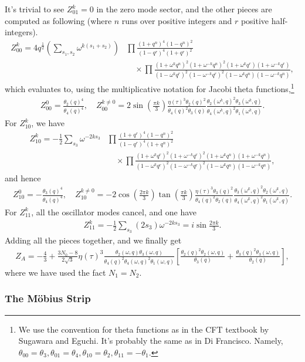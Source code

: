 \documentclass[12pt]{article}
\newcommand{\ie}{\begin{equation}\begin{aligned}}
\newcommand{\fe}{\end{aligned}\end{equation}}
\begin{document}
It's trivial to see $Z_{01}^k=0$ in the zero mode sector, and the other pieces are computed as following (where $n$ runs over positive integers and $r$ positive half-integers).  
\ie
Z_{00}^k = 4q^{\frac{1}{2}}\left(\sum_{s_1,s_2} \omega^{k(s_1+s_2)}\right)&\prod \frac{(1+q^n)^4(1-q^n)^2}{(1-q^r)^4(1+q^r)^2} \\
&\quad \times\prod \frac{(1+\omega^k q^n)^2(1+\omega^{-k} q^n)^2(1+\omega^k q^r)(1+\omega^{-k}q^r)}{(1-\omega^k q^r)^2(1-\omega^{-k} q^r)^2(1-\omega^k q^n)(1-\omega^{-k} q^n)},
\fe
which evaluates to, using the multiplicative notation for Jacobi theta functions,\footnote{We use the convention for theta functions as in the CFT textbook by Sugawara and Eguchi. It's probably the same as in Di Francisco. Namely, $\theta_{00}=\theta_3, \theta_{01}=\theta_4, \theta_{10}=\theta_2, \theta_{11}=-\theta_1$.}
\ie
Z_{00}^0 = \frac{\theta_2(q)^4}{\theta_4(q)^4},\quad Z_{00}^{{k\neq 0}}= 2\sin (\tfrac{\pi k}{3}) \frac{\eta(\tau)^3\theta_2(q)^2}{\theta_4(q)^2\theta_3(q)} \frac{\theta_2(\omega^k,q)^2\theta_3(\omega^k,q)}{\theta_4(\omega^k,q)^2\theta_1(\omega^k,q)}.
\fe
For $Z_{10}^k$, we have
\ie
Z_{10}^k = -\frac{1}{2}\sum_{s_3}\omega^{-2ks_3}&\prod \frac{(1+q^r)^4(1-q^n)^2}{(1-q^r)^4(1+q^n)^2}\\
&\quad \times\prod \frac{(1+\omega^k q^r)^2(1+\omega^{-k}q^r)^2(1+\omega^k q^n)(1+\omega^{-k}q^n)}{(1-\omega^k q^r)^2(1-\omega^{-k} q^r)^2(1-\omega^k q^n)(1-\omega^{-k}q^n)},
\fe
and hence
\ie
Z_{10}^0 = -\frac{\theta_3(q)^4}{\theta_4(q)^4},\quad Z_{10}^{k\neq 0}=-2\cos(\tfrac{2\pi k}{3})\tan(\tfrac{\pi k}{3})\frac{\eta(\tau)^3\theta_3(q)^2}{\theta_4(q)^2\theta_2(q)} \frac{\theta_3(\omega^k,q)^2\theta_2(\omega^k,q)}{\theta_4(\omega^k,q)^2\theta_1(\omega^k,q)}.
\fe
For $Z_{11}^k$, all the oscillator modes cancel, and one have
\ie
Z_{11}^k = -\frac{1}{2}\sum_{s_3}(2s_3)\omega^{-2ks_3}= i\sin \frac{2\pi k}{3}.
\fe
Adding all the pieces together, and we finally get
\ie \label{Za}
Z_A = -\frac{4}{3}+\frac{3N_0-8}{2\sqrt{3}}\eta(\tau)^3\frac{\theta_2(\omega,q)\theta_3(\omega,q)}{\theta_4(q)^2\theta_4(\omega,q)^2\theta_1(\omega,q)}
\left[
\frac{\theta_2(q)^2\theta_2(\omega,q)}{\theta_3(q)}
+
\frac{\theta_3(q)^2\theta_3(\omega,q)}{\theta_2(q)}
\right],
\fe
where we have used the fact $N_1=N_2$.

\subsubsection*{The M\"obius Strip}
\end{document}
